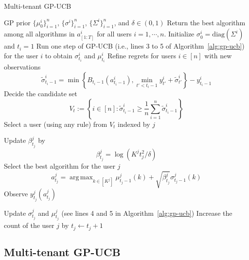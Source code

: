 \documentclass[letterpaper]{vldb}
\DeclareMathOperator*{\argmax}{arg\,max}
\begin{document}
\begin{algorithm} [t]                     %
\scriptsize
\caption{Multi-tenant GP-UCB}          %
\label{alg:mc-general}                           %
\begin{algorithmic}[1]                    %
   \REQUIRE GP prior $\{\mu_0^i\}_{i=1}^n$, $\{\sigma^i\}_{i=1}^n$, $\{\Sigma^i\}_{i=1}^n$, and $\delta\in (0,1)$
   \ENSURE Return the best algorithm among all algorithms in $a_{[1:T]}^i$ for all users $i=1, \cdots, n$.
       \STATE Initialize $\sigma_0^i = \text{diag}(\Sigma^i)$ and $t_i=1$
       \STATE Run one step of GP-UCB (i.e., lines 3 to 5 of Algorithm~\ref{alg:gp-ucb}) for the user $i$ to obtain $\sigma^i_{t_i}$ and $\mu^i_{t_i}$
   \ENDFOR
        \STATE Refine regrets for users $i\in[n]$ with new observations
        \[
   \tilde{\sigma}^i_{t_i-1} = \min\left\{B_{t_i-1}(a^i_{t_i-1}), \min_{t'<t_i-1} y^i_{t'}+ \tilde{\sigma}^{i}_{t'} \right\} - y^i_{t_i-1} 
   \]
      \STATE Decide the candidate set
   \[
     V_t := \left\{ i\in [n]: 
         \tilde{\sigma}^i_{t_i-1} \ge \frac{1}{n}
       \sum_{i=1}^n 
         \tilde{\sigma}^i_{t_i-1}\right\}
   \]
   \STATE Select a user (using any rule) from $V_t$ indexed by $j$

   \STATE  Update $\beta_{t_j}^j$ by
   \[
     \beta_{t_j}^j = \log (K^j t_j^2/\delta)
   \]
   \STATE Select the best algorithm for the user $j$
   \[
     a^j_{t_j} = \argmax_{k\in [K^j]}\mu^j_{{t_j}-1}(k) + \sqrt{\beta^j_{t_j}}\sigma^j_{t_j-1}(k)
     \]
     \STATE Observe $y^j_{t_j}(a^j_{t_j})$

     \STATE Update $\sigma^j_{t_j}$ and $\mu^j_{t_j}$ (see lines 4 and 5 in Algorithm~\ref{alg:gp-ucb})
        \STATE Increase the count of the user $j$ by $t_j \leftarrow t_j + 1$
   \ENDFOR
\end{algorithmic}
\end{algorithm}


\subsection{Multi-tenant GP-UCB}
\end{document}
